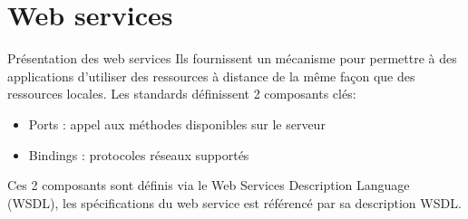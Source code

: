 \section{Web services}
\begin{frame}{Présentation des web services}
Ils fournissent un mécanisme pour permettre à des applications d’utiliser des ressources à distance de la même façon que des ressources locales.
Les standards définissent 2 composants clés:
\begin{itemize}
\item Ports : appel aux méthodes disponibles sur le serveur  
\item Bindings : protocoles réseaux supportés
\end{itemize}
Ces 2 composants sont définis via le Web Services Description Language (WSDL), les spécifications du web service est référencé par sa description WSDL.
\end{frame}


